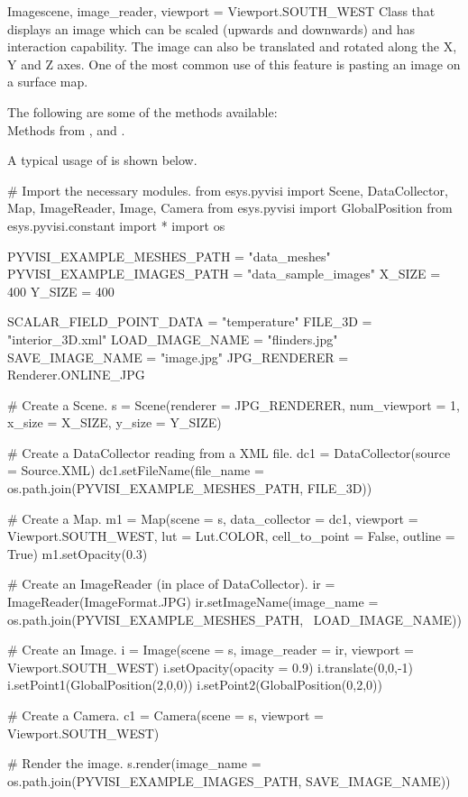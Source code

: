 \begin{classdesc}{Image}{scene, image_reader, viewport = Viewport.SOUTH_WEST}
Class that displays an image which can be scaled (upwards and downwards) and
has interaction capability. The image can also be translated and rotated along 
the X, Y and Z axes. One of the most common use of this feature is pasting an 
image on a surface map.
\end{classdesc}

The following are some of the methods available:\\
Methods from \ActorThreeD, \PlaneSource and \Transform.

A typical usage of \Image is shown below.

\begin{python}
# Import the necessary modules.
from esys.pyvisi import Scene, DataCollector, Map, ImageReader, Image, Camera
from esys.pyvisi import GlobalPosition
from esys.pyvisi.constant import *
import os

PYVISI_EXAMPLE_MESHES_PATH = "data_meshes"
PYVISI_EXAMPLE_IMAGES_PATH = "data_sample_images"
X_SIZE = 400
Y_SIZE = 400

SCALAR_FIELD_POINT_DATA = "temperature"
FILE_3D = "interior_3D.xml"
LOAD_IMAGE_NAME = "flinders.jpg"
SAVE_IMAGE_NAME = "image.jpg"
JPG_RENDERER = Renderer.ONLINE_JPG

# Create a Scene.
s = Scene(renderer = JPG_RENDERER, num_viewport = 1, x_size = X_SIZE, 
        y_size = Y_SIZE)

# Create a DataCollector reading from a XML file.
dc1 = DataCollector(source = Source.XML)
dc1.setFileName(file_name = os.path.join(PYVISI_EXAMPLE_MESHES_PATH, FILE_3D))

# Create a Map.
m1 = Map(scene = s, data_collector = dc1, viewport = Viewport.SOUTH_WEST,
        lut = Lut.COLOR, cell_to_point = False, outline = True)
m1.setOpacity(0.3)

# Create an ImageReader (in place of DataCollector).
ir = ImageReader(ImageFormat.JPG)
ir.setImageName(image_name =  os.path.join(PYVISI_EXAMPLE_MESHES_PATH, \
        LOAD_IMAGE_NAME))

# Create an Image.
i = Image(scene = s, image_reader = ir, viewport = Viewport.SOUTH_WEST)
i.setOpacity(opacity = 0.9)
i.translate(0,0,-1)
i.setPoint1(GlobalPosition(2,0,0))
i.setPoint2(GlobalPosition(0,2,0))

# Create a Camera. 
c1 = Camera(scene = s, viewport = Viewport.SOUTH_WEST)

# Render the image.
s.render(image_name = os.path.join(PYVISI_EXAMPLE_IMAGES_PATH, SAVE_IMAGE_NAME))
\end{python}

